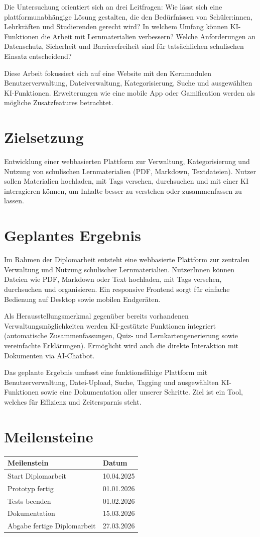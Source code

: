 Die Untersuchung orientiert sich an drei Leitfragen: 
Wie lässt sich eine plattformunabhängige Lösung gestalten, die den Bedürfnissen von Schüler:innen, Lehrkräften und Studierenden gerecht wird? 
In welchem Umfang können KI-Funktionen die Arbeit mit Lernmaterialien verbessern? 
Welche Anforderungen an Datenschutz, Sicherheit und Barrierefreiheit sind für tatsächlichen schulischen Einsatz entscheidend?

Diese Arbeit fokussiert sich auf eine Website mit den Kernmodulen Benutzerverwaltung, 
Dateiverwaltung, Kategorisierung, Suche und ausgewählten KI-Funktionen. 
Erweiterungen wie eine mobile App oder Gamification werden als mögliche Zusatzfeatures betrachtet.

\section*{Zielsetzung}
Entwicklung einer webbasierten Plattform zur Verwaltung, Kategorisierung und Nutzung von schulischen Lernmaterialien (PDF, Markdown, Textdateien). 
Nutzer sollen Materialien hochladen, mit Tags versehen, durchsuchen und mit einer KI interagieren können, um Inhalte besser zu verstehen oder zusammenfassen zu lassen.

\section*{Geplantes Ergebnis}
Im Rahmen der Diplomarbeit entsteht eine webbasierte Plattform zur zentralen Verwaltung und Nutzung schulischer Lernmaterialien. 
NutzerInnen können Dateien wie PDF, Markdown oder Text hochladen, mit Tags versehen, durchsuchen und organisieren. 
Ein responsive Frontend sorgt für einfache Bedienung auf Desktop sowie mobilen Endgeräten.

Als Herausstellungsmerkmal gegenüber bereits vorhandenen Verwaltungsmöglichkeiten werden KI-gestützte Funktionen integriert 
(automatische Zusammenfassungen, Quiz- und Lernkartengenerierung sowie vereinfachte Erklärungen). 
Ermöglicht wird auch die direkte Interaktion mit Dokumenten via AI-Chatbot.

Das geplante Ergebnis umfasst eine funktionsfähige Plattform mit Benutzerverwaltung, 
Datei-Upload, Suche, Tagging und ausgewählten KI-Funktionen sowie eine Dokumentation aller unserer Schritte. 
Ziel ist ein Tool, welches für Effizienz und Zeitersparnis steht.

\section*{Meilensteine}
\begin{longtable}{ll}
    \toprule
    \textbf{Meilenstein} & \textbf{Datum} \\
    \midrule
    Start Diplomarbeit & 10.04.2025 \\
    Prototyp fertig & 01.01.2026 \\
    Tests beenden & 01.02.2026 \\
    Dokumentation & 15.03.2026 \\
    Abgabe fertige Diplomarbeit & 27.03.2026 \\
    \bottomrule
\end{longtable}

